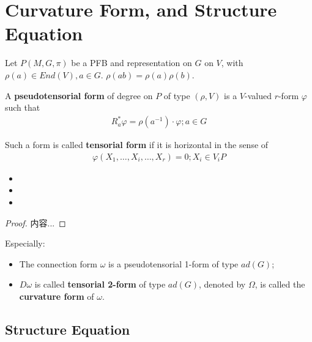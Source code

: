 \documentclass[Total.tex]{subfiles}
\begin{document}
		\section{Curvature Form, and Structure Equation}
				\begin{Def}
					Let $P(M,G,\pi)$ be a PFB and representation on $G$ on $V$, with $\rho(a)\in End(V),a\in G$. $\rho(ab)=\rho(a)\rho(b)$. 
					
					A \textbf{pseudotensorial form} of degree on $P$ of type $(\rho,V)$ is a $V$-valued $r$-form $\varphi$ such that
					\begin{gather*}
						R_a^*\varphi=\rho(a^{-1})\cdot \varphi;a\in G
					\end{gather*} 
					
					Such a form is called \textbf{tensorial form} if it is horizontal in the sense of
					\begin{gather*}
						\varphi(X_1,\dots,X_i,\dots,X_r)=0;X_i\in V_i P
					\end{gather*}
				\end{Def}
				
				\begin{proposition}
					\begin{itemize}
						\item 
						\item 
						\item 
					\end{itemize}
				\end{proposition}
				
				\begin{proof}
					内容...
				\end{proof}
				
				Especially:
				\begin{Def}
					\begin{itemize}
						\item The connection form $\omega$ is a pseudotensorial 1-form of type $ad(G)$;
						\item $D\omega$  is called \textbf{tensorial 2-form} of type $ad(G)$, denoted by $\Omega$, is called the \textbf{curvature form} of $\omega$. 
					\end{itemize}
				\end{Def}
				
				\subsection{Structure Equation}
				
\end{document}
